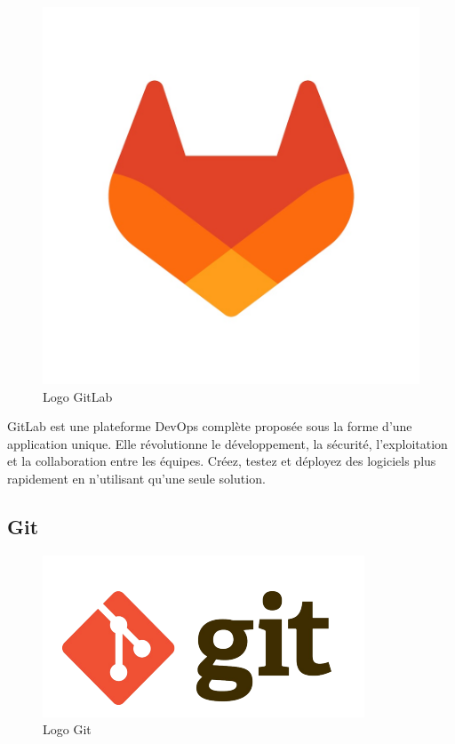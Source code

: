 \begin{figure}[H]
    \centering
    \includegraphics[scale=0.1]{Logos/gitlab.jpg}
    \caption{Logo GitLab}
\end{figure}

GitLab est une plateforme DevOps complète proposée
sous la forme d’une application unique. Elle révolutionne le
développement, la sécurité, l’exploitation et la collaboration
entre les équipes. Créez, testez et déployez des logiciels plus
rapidement en n’utilisant qu’une seule solution. \cite{GitLab}

\subsection{Git}

\begin{figure}[H]
    \centering
    \includegraphics[scale=0.5]{Logos/git.png}
    \caption{Logo Git}
\end{figure}

